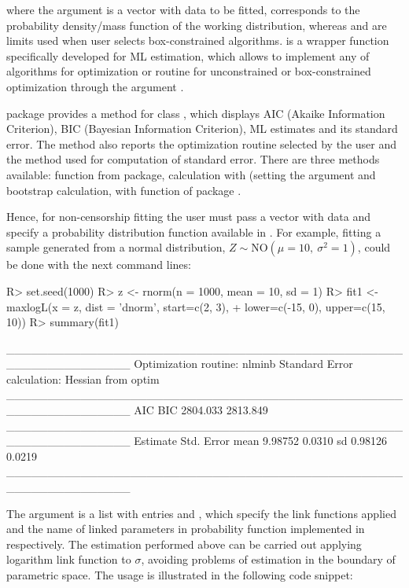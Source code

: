 \documentclass[nojss]{jss}
\begin{document}
where the argument  is a vector with data to be fitted,  corresponds to the probability density/mass function of the working distribution, whereas  and  are limits used when user selects box-constrained algorithms.  is a wrapper function specifically developed for ML estimation, which allows to implement any of  algorithms for optimization or  routine for unconstrained or box-constrained optimization through the argument .

 package provides a  method for class , which displays AIC (Akaike Information Criterion), BIC (Bayesian Information Criterion), ML estimates and its standard error. The method also reports the optimization routine selected by the user and the method used for computation of standard error. There are three methods available:  function from  package, calculation with  (setting the argument  and bootstrap calculation, with  function of  package \citep{Davison1997, Canty2017}.

Hence, for non-censorship fitting the user must pass a vector with data and specify a probability distribution function available in . For example, fitting a sample generated from a normal distribution, $Z \sim \text{NO}(\mu=10,\: \sigma^2=1)$, could be done with the next command lines:

\begin{Schunk}
\begin{Sinput}
R> set.seed(1000)
R> z <- rnorm(n = 1000, mean = 10, sd = 1)
R> fit1 <- maxlogL(x = z, dist = 'dnorm', start=c(2, 3),
+                  lower=c(-15, 0), upper=c(15, 10))
R> summary(fit1)
\end{Sinput}
\begin{Soutput}
_______________________________________________________________
Optimization routine: nlminb 
Standard Error calculation: Hessian from optim 
_______________________________________________________________
       AIC      BIC
  2804.033 2813.849
_______________________________________________________________
     Estimate  Std. Error
mean   9.98752     0.0310
sd     0.98126     0.0219
_______________________________________________________________
\end{Soutput}
\end{Schunk}

The  argument is a list with entries  and , which specify the link functions applied and the name of linked parameters in probability function implemented in  respectively. The estimation performed above can be carried out applying logarithm link function to $\sigma$, avoiding problems of estimation in the boundary of parametric space. The usage is illustrated in the following code snippet:
\end{document}
